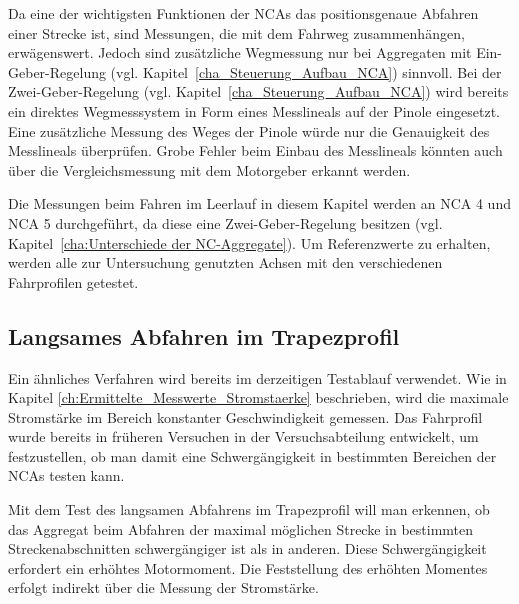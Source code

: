 Da eine der wichtigsten Funktionen der NCAs das positionsgenaue Abfahren einer Strecke ist, sind Messungen, die mit dem Fahrweg zusammenhängen, erwägenswert. Jedoch sind zusätzliche Wegmessung nur bei Aggregaten mit Ein-Geber-Regelung (vgl. Kapitel~\ref{cha_Steuerung_Aufbau_NCA}) sinnvoll. Bei der Zwei-Geber-Regelung (vgl. Kapitel~\ref{cha_Steuerung_Aufbau_NCA}) wird bereits ein direktes Wegmesssystem in Form eines Messlineals auf der Pinole eingesetzt. Eine zusätzliche Messung des Weges der Pinole würde nur die Genauigkeit des Messlineals überprüfen. Grobe Fehler beim Einbau des Messlineals könnten auch über die Vergleichsmessung mit dem Motorgeber erkannt werden.



Die Messungen beim Fahren im Leerlauf in diesem Kapitel werden an NCA 4 und NCA 5 durchgeführt, da diese eine Zwei-Geber-Regelung besitzen (vgl. Kapitel~\ref{cha:Unterschiede der NC-Aggregate}). Um Referenzwerte zu erhalten, werden alle zur Untersuchung genutzten Achsen mit den verschiedenen Fahrprofilen getestet.









\subsection{Langsames Abfahren im Trapezprofil}\label{cha:Langsames Abfahren im Trapezprofil}

Ein ähnliches Verfahren wird bereits im derzeitigen Testablauf verwendet. Wie in Kapitel \ref{ch:Ermittelte_Messwerte_Stromstaerke} beschrieben, wird die maximale Stromstärke im Bereich konstanter Geschwindigkeit gemessen. Das Fahrprofil wurde bereits in früheren Versuchen in der Versuchsabteilung entwickelt, um festzustellen, ob man damit eine Schwergängigkeit in bestimmten Bereichen der NCAs testen kann.

Mit dem Test des langsamen Abfahrens im Trapezprofil will man erkennen, ob das Aggregat beim Abfahren der maximal möglichen Strecke in bestimmten Streckenabschnitten schwergängiger ist als in anderen. Diese Schwergängigkeit erfordert ein erhöhtes Motormoment. Die Feststellung des erhöhten Momentes erfolgt indirekt über die Messung der Stromstärke. 

